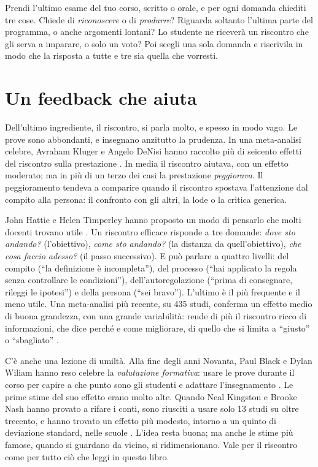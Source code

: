 \begin{esercizio}
Prendi l'ultimo esame del tuo corso, scritto o orale, e per ogni
domanda chiediti tre cose. Chiede di \emph{riconoscere} o di
\emph{produrre}? Riguarda soltanto l'ultima parte del programma, o
anche argomenti lontani? Lo studente ne riceverà un riscontro che gli
serva a imparare, o solo un voto? Poi scegli una sola domanda e
riscrivila in modo che la risposta a tutte e tre sia quella che
vorresti.
\end{esercizio}

\section{Un feedback che aiuta}

Dell'ultimo ingrediente, il riscontro, si parla molto, e spesso in
modo vago. Le prove sono abbondanti, e insegnano anzitutto la
prudenza. In una meta-analisi celebre, Avraham Kluger e Angelo DeNisi
hanno raccolto più di seicento effetti del riscontro sulla prestazione
\parencite{kluger1996}. In media il riscontro aiutava, con un effetto
moderato; ma in più di un terzo dei casi la prestazione
\emph{peggiorava}. Il peggioramento tendeva a comparire quando il
riscontro spostava l'attenzione dal compito alla persona: il
confronto con gli altri, la lode o la critica generica.

John Hattie e Helen Timperley hanno proposto un modo di pensarlo che
molti docenti trovano utile \parencite{hattie2007}. Un riscontro
efficace risponde a tre domande: \emph{dove sto andando?} (l'obiettivo),
\emph{come sto andando?} (la distanza da quell'obiettivo),
\emph{che cosa faccio adesso?} (il passo successivo). E può parlare a
quattro livelli: del compito (\enquote{la definizione è incompleta}),
del processo (\enquote{hai applicato la regola senza controllare le
condizioni}), dell'autoregolazione (\enquote{prima di consegnare,
rileggi le ipotesi}) e della persona (\enquote{sei bravo}). L'ultimo è
il più frequente e il meno utile. Una meta-analisi più recente, su 435
studi, conferma un effetto medio di buona grandezza, con una grande
variabilità: rende di più il riscontro ricco di informazioni, che dice
perché e come migliorare, di quello che si limita a \enquote{giusto} o
\enquote{sbagliato} \parencite{wisniewski2020}.

C'è anche una lezione di umiltà. Alla fine degli anni Novanta, Paul
Black e Dylan Wiliam hanno reso celebre la \emph{valutazione
formativa}: usare le prove durante il corso per capire a che punto
sono gli studenti e adattare l'insegnamento \parencite{black1998}. Le
prime stime del suo effetto erano molto alte. Quando Neal Kingston e
Brooke Nash hanno provato a rifare i conti, sono riusciti a usare solo
13 studi su oltre trecento, e hanno trovato un effetto più modesto,
intorno a un quinto di deviazione standard, nelle scuole
\parencite{kingston2011}. L'idea resta buona; ma anche le stime più
famose, quando si guardano da vicino, si ridimensionano. Vale per il
riscontro come per tutto ciò che leggi in questo libro.

